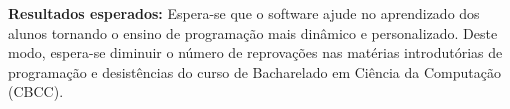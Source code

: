 \documentclass[12pt,english,brazil,a4paper,utf8,oneside]{utfpr-tcc}
\begin{document}
\begin{resumo}
\textbf{Resultados esperados:} Espera-se que o software ajude no aprendizado dos alunos tornando o ensino de programação mais dinâmico e personalizado. Deste modo, espera-se diminuir o número de reprovações nas matérias introdutórias de programação e desistências do curso de Bacharelado em Ciência da Computação (CBCC).


\end{resumo}







\listoffigures
\listoftables

\tableofcontents

\mainmatter










\backmatter
\end{document}

